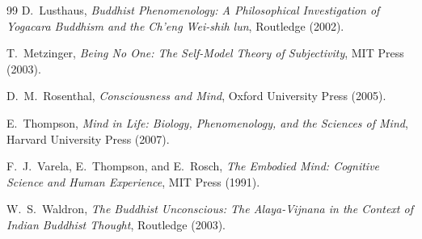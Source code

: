 \documentclass[12pt,a4paper]{article}
\begin{document}
\begin{thebibliography}{99}
D.~Lusthaus,
\emph{Buddhist Phenomenology: A Philosophical Investigation of Yogacara Buddhism and the Ch'eng Wei-shih lun},
Routledge (2002).

T.~Metzinger,
\emph{Being No One: The Self-Model Theory of Subjectivity},
MIT Press (2003).

D.~M.~Rosenthal,
\emph{Consciousness and Mind},
Oxford University Press (2005).

E.~Thompson,
\emph{Mind in Life: Biology, Phenomenology, and the Sciences of Mind},
Harvard University Press (2007).

F.~J.~Varela, E.~Thompson, and E.~Rosch,
\emph{The Embodied Mind: Cognitive Science and Human Experience},
MIT Press (1991).

W.~S.~Waldron,
\emph{The Buddhist Unconscious: The Alaya-Vijnana in the Context of Indian Buddhist Thought},
Routledge (2003).

\end{thebibliography}
\end{document}
